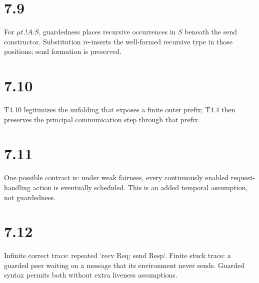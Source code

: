 \section*{7.9}
For $\mu t.!A.S$, guardedness places recursive occurrences in $S$ beneath the send constructor. Substitution re-inserts the well-formed recursive type in those positions; send formation is preserved.

\section*{7.10}
T4.10 legitimizes the unfolding that exposes a finite outer prefix; T4.4 then preserves the principal communication step through that prefix.

\section*{7.11}
One possible contract is: under weak fairness, every continuously enabled request-handling action is eventually scheduled. This is an added temporal assumption, not guardedness.

\section*{7.12}
Infinite correct trace: repeated `recv Req; send Resp`. Finite stuck trace: a guarded peer waiting on a message that its environment never sends. Guarded syntax permits both without extra liveness assumptions.
